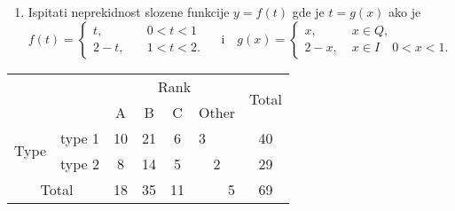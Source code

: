 \documentclass[11pt, a4paper, leqno]{article}
\begin{document}
\begin{enumerate}
        \item Ispitati neprekidnost slozene funkcije $y=f(t)$ gde je $t=g(x)$ ako je
        $$
            f(t)=\left\{ 
                \begin{array}{ll}
                    t, & \quad 0<t<1\;\;\\
                    2-t,& \quad 1<t<2.\;
                \end{array}
             \right.
             \quad \mbox{i} \quad g(x)= \left\{
                \begin{array}{ll}
                    x, & \; x \in Q, \;\; \\
                    2-x,& \; x \in I \quad 0<x<1.\;
                \end{array}
             \right.
        $$
    \end{enumerate}
    \medskip
    \begin{center}
        \begin{tabular}{|c|c|cccc|c|}
        \hline
            \multicolumn{2}{|c|}{\multirow{2}{*}{}} & \multicolumn{4}{|c|}{Rank} & \multirow{2}{*}{Total}\\
            \cline{3-6}
            \multicolumn{2}{|c|}{} & A & B & C & Other & \\
            \hline
            \multirow{2}{*}{Type} & type 1 & 10 & 21 & 6 & \multicolumn{1}{l}{3} & 40\\
            \cline{2-7}
            & type 2 & 8 & 14 & 5 & \multicolumn{1}{c}{2} & 29\\
            \hline
            \multicolumn{2}{|c|}{Total} & 18 & 35 & 11 & \multicolumn{1}{r}{5} & 69\\
            \hline
        \end{tabular}
    \end{center}
\end{document}
